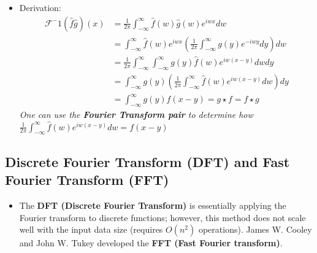 \documentclass[11.5pt,a4paper]{article}
\begin{document}
\begin{itemize}
\begin{enumerate}
\begin{itemize}
\begin{equation*}
            \end{equation*}
            \item Derivation:
            \begin{align*}
                \mathcal{F}^-1(\hat{f}\hat{g})(x) &= \frac{1}{2\pi} \int^{\infty}_{-\infty} \hat{f}(w)\hat{g}(w)e^{iwx}dw\\
                &= \int^{\infty}_{-\infty}\hat{f}(w)e^{iwx}\left( \frac{1}{2\pi} \int^{\infty}_{-\infty}g(y)e^{-iwy}dy \right)dw \\
                &= \frac{1}{2\pi} \int^{\infty}_{-\infty} \int^{\infty}_{-\infty} g(y)\hat{f}(w)e^{iw(x-y)}dwdy \\
                &= \int^{\infty}_{-\infty} g(y) \left( \frac{1}{2\pi}\int^{\infty}_{-\infty} \hat{f}(w)e^{iw(x-y)}dw \right)dy \\
                &= \int^{\infty}_{-\infty} g(y)f(x-y) = g \star f = f \star g
            \end{align*}
            \textit{One can use the \textbf{Fourier Transform pair} to determine how $\frac{1}{2\pi}\int^{\infty}_{-\infty} \hat{f}(w)e^{iw(x-y)}dw = f(x-y)$}
        \end{itemize}
    \end{enumerate}
\end{itemize}

\subsection*{Discrete Fourier Transform (DFT) and Fast Fourier Transform (FFT)}
\begin{itemize}
    \item The \textbf{DFT (Discrete Fourier Transform)} is essentially applying the Fourier transform to discrete functions; however, this method does not scale well with the input data size (requires $O(n^2)$ operations). James W. Cooley and John W. Tukey developed the \textbf{FFT (Fast Fourier transform)}.
\end{itemize}
\end{document}
